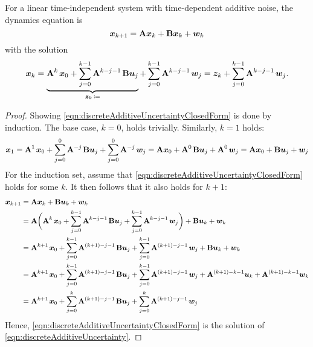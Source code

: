 	For a linear time-independent system with time-dependent additive noise, the dynamics equation is
	\begin{equation}
		\bm{x}_{k + 1} = \bm{\mathrm{A}} \bm{x}_k + \bm{\mathrm{B}} \bm{x}_k + \bm{w}_k  \label{eqn:discreteAdditiveUncertainty}
	\end{equation}
	with the solution
	\begin{equation}
		\bm{x}_k
		= \underbrace{\bm{\mathrm{A}}^{k\,} \bm{x}_0 + \sum_{j = 0}^{k - 1} \bm{\mathrm{A}}^{k - j - 1\,} \bm{\mathrm{B}} \bm{u}_j}_{\bm{z}_k \,\coloneqq} + \sum_{j = 0}^{k - 1} \bm{\mathrm{A}}^{k - j - 1\,} \bm{w}_j
		= \bm{z}_k + \sum_{j = 0}^{k - 1} \bm{\mathrm{A}}^{k - j - 1\,} \bm{w}_j.
		\label{eqn:discreteAdditiveUncertaintyClosedForm}
	\end{equation}
	\begin{proof}
		Showing \eqref{eqn:discreteAdditiveUncertaintyClosedForm} is done by induction. The base case, \( k = 0 \), holds trivially. Similarly, \( k = 1 \) holds:
		\begin{equation}
			\bm{x}_1
			= \bm{\mathrm{A}}^{1\,} \bm{x}_0 + \sum_{j = 0}^{0} \bm{\mathrm{A}}^{-j\,} \bm{\mathrm{B}} \bm{u}_j + \sum_{j = 0}^{0} \bm{\mathrm{A}}^{-j\,} \bm{w}_j
			= \bm{\mathrm{A}} \bm{x}_0 + \bm{\mathrm{A}}^{0\,} \bm{\mathrm{B}} \bm{u}_j + \bm{\mathrm{A}}^{0\,} \bm{w}_j
			= \bm{\mathrm{A}} \bm{x}_0 + \bm{\mathrm{B}} \bm{u}_j + \bm{w}_j
		\end{equation}
		For the induction set, assume that \eqref{eqn:discreteAdditiveUncertaintyClosedForm} holds for some \(k\). It then follows that it also holds for \(k + 1\):
		\begin{align}
			\bm{x}_{k + 1}
			 & = \bm{\mathrm{A}} \bm{x}_k + \bm{\mathrm{B}} \bm{u}_k + \bm{w}_k                                                                                                                                                                                         \\
			 & = \bm{\mathrm{A}} \biggl( \bm{\mathrm{A}}^{k\,} \bm{x}_0 + \sum_{j = 0}^{k - 1} \bm{\mathrm{A}}^{k - j - 1\,} \bm{\mathrm{B}} \bm{u}_j + \sum_{j = 0}^{k - 1} \bm{\mathrm{A}}^{k - j - 1\,} \bm{w}_j \biggr) + \bm{\mathrm{B}} \bm{u}_k + \bm{w}_k                                     \\
			 & = \bm{\mathrm{A}}^{k + 1\,} \bm{x}_0 + \sum_{j = 0}^{k - 1} \bm{\mathrm{A}}^{(k + 1) - j - 1\,} \bm{\mathrm{B}} \bm{u}_j + \sum_{j = 0}^{k - 1} \bm{\mathrm{A}}^{(k + 1) - j - 1\,} \bm{w}_j + \bm{\mathrm{B}} \bm{u}_k + \bm{w}_k                                             \\
			 & = \bm{\mathrm{A}}^{k + 1\,} \bm{x}_0 + \sum_{j = 0}^{k - 1} \bm{\mathrm{A}}^{(k + 1) - j - 1\,} \bm{\mathrm{B}} \bm{u}_j + \sum_{j = 0}^{k - 1} \bm{\mathrm{A}}^{(k + 1) - j - 1\,} \bm{w}_j + \bm{\mathrm{A}}^{(k + 1) - k - 1} \bm{u}_k + \bm{\mathrm{A}}^{(k + 1) - k - 1} \bm{w}_k \\
			 & = \bm{\mathrm{A}}^{k + 1\,} \bm{x}_0 + \sum_{j = 0}^{k} \bm{\mathrm{A}}^{(k + 1) - j - 1\,} \bm{\mathrm{B}} \bm{u}_j + \sum_{j = 0}^{k} \bm{\mathrm{A}}^{(k + 1) - j - 1\,} \bm{w}_j                                                                                     \\
		\end{align}
		Hence, \eqref{eqn:discreteAdditiveUncertaintyClosedForm} is the solution of \eqref{eqn:discreteAdditiveUncertainty}.
	\end{proof}

